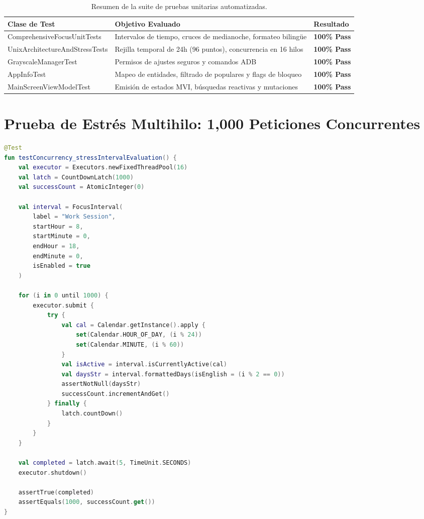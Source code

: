 \documentclass[11pt,a4paper,oneside]{report}
\begin{document}
\begin{table}[h!]
\centering
\small
\begin{tabularx}{\textwidth}{>{\raggedright\arraybackslash\ttfamily}p{5.8cm} >{\raggedright\arraybackslash}X >{\centering\arraybackslash}p{2.6cm}}
\toprule
\textbf{\textrm{\textbf{Clase de Test}}} & \textbf{\textrm{\textbf{Objetivo Evaluado}}} & \textbf{\textrm{\textbf{Resultado}}} \\
\midrule
ComprehensiveFocusUnitTests & Intervalos de tiempo, cruces de medianoche, formateo bilingüe & \textbf{100\% Pass} \\
UnixArchitectureAndStressTests & Rejilla temporal de 24h (96 puntos), concurrencia en 16 hilos & \textbf{100\% Pass} \\
GrayscaleManagerTest & Permisos de ajustes seguros y comandos ADB & \textbf{100\% Pass} \\
AppInfoTest & Mapeo de entidades, filtrado de populares y flags de bloqueo & \textbf{100\% Pass} \\
MainScreenViewModelTest & Emisión de estados MVI, búsquedas reactivas y mutaciones & \textbf{100\% Pass} \\
\bottomrule
\end{tabularx}
\caption{Resumen de la suite de pruebas unitarias automatizadas.}
\label{tab:test_suite}
\end{table}

\section{Prueba de Estrés Multihilo: 1,000 Peticiones Concurrentes}
\begin{lstlisting}[language=Kotlin, caption={Prueba de estrés de concurrencia multihilo.}]
@Test
fun testConcurrency_stressIntervalEvaluation() {
    val executor = Executors.newFixedThreadPool(16)
    val latch = CountDownLatch(1000)
    val successCount = AtomicInteger(0)

    val interval = FocusInterval(
        label = "Work Session",
        startHour = 8,
        startMinute = 0,
        endHour = 18,
        endMinute = 0,
        isEnabled = true
    )

    for (i in 0 until 1000) {
        executor.submit {
            try {
                val cal = Calendar.getInstance().apply {
                    set(Calendar.HOUR_OF_DAY, (i % 24))
                    set(Calendar.MINUTE, (i % 60))
                }
                val isActive = interval.isCurrentlyActive(cal)
                val daysStr = interval.formattedDays(isEnglish = (i % 2 == 0))
                assertNotNull(daysStr)
                successCount.incrementAndGet()
            } finally {
                latch.countDown()
            }
        }
    }

    val completed = latch.await(5, TimeUnit.SECONDS)
    executor.shutdown()

    assertTrue(completed)
    assertEquals(1000, successCount.get())
}
\end{lstlisting}
\end{document}
